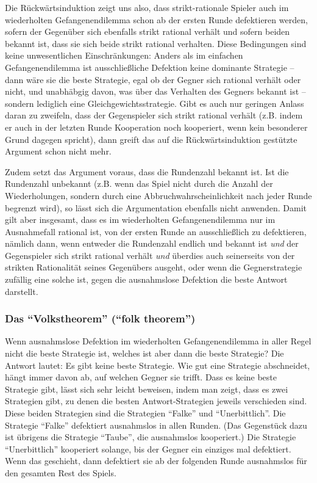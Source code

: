 Die Rückwärtsinduktion zeigt uns also, dass strikt-rationale Spieler
auch im wiederholten Gefangenendilemma schon ab der ersten Runde defektieren
werden, sofern der Gegenüber sich ebenfalls strikt rational verhält und sofern
beiden bekannt ist, dass sie sich beide strikt rational verhalten. Diese
Bedingungen sind keine unwesentlichen Einschränkungen: Anders als im einfachen
Gefangenendilemma ist ausschließliche Defektion keine dominante Strategie --
dann wäre sie die beste Strategie, egal ob der Gegner sich rational verhält
oder nicht, und unabhäbgig davon, was über das Verhalten des Gegners bekannt
ist -- sondern lediglich eine Gleichgewichtsstrategie. Gibt es auch nur
geringen Anlass daran zu zweifeln, dass der Gegenspieler sich strikt
rational verhält (z.B. indem er auch in der letzten Runde Kooperation noch
kooperiert, wenn kein besonderer Grund dagegen spricht), dann greift das
auf die Rückwärtsinduktion gestützte Argument schon nicht mehr.

Zudem setzt das Argument voraus, dass die Rundenzahl bekannt ist. Ist die
Rundenzahl unbekannt (z.B. wenn das Spiel nicht durch die Anzahl der
Wiederholungen, sondern durch eine Abbruchwahrscheinlichkeit nach jeder Runde
begrenzt wird), so lässt sich die Argumentation ebenfalls nicht anwenden. Damit
gilt aber insgesamt, dass es im wiederholten Gefangenendilemma nur im
Ausnahmefall rational ist, von der ersten Runde an ausschließlich zu
defektieren, nämlich dann, wenn entweder die Rundenzahl endlich und bekannt ist
{\em und} der Gegenspieler sich strikt rational verhält {\em und} überdies auch
seinerseits von der strikten Rationalität seines Gegenübers ausgeht, oder wenn die
Gegnerstrategie zufällig eine solche ist, gegen die ausnahmslose Defektion die
beste Antwort darstellt.

\subsubsection{Das "`Volkstheorem"' ("`folk theorem"')}

Wenn ausnahmslose Defektion im wiederholten Gefangenendilemma in aller Regel
nicht die beste Strategie ist, welches ist aber dann die beste Strategie? Die
Antwort lautet: Es gibt keine beste Strategie. Wie gut eine Strategie
abschneidet, hängt immer davon ab, auf welchen Gegner sie trifft. Dass es keine
beste Strategie gibt, lässt sich sehr leicht beweisen, indem man zeigt, dass
es zwei Strategien gibt, zu denen die besten Antwort-Strategien jeweils
verschieden sind. Diese beiden Strategien sind die Strategien "`Falke"' und
"`Unerbittlich"'. Die Strategie "`Falke"' defektiert ausnahmslos in allen
Runden. (Das Gegenstück dazu ist übrigens die Strategie "`Taube"', die
ausnahmslos kooperiert.) Die Strategie "`Unerbittlich"' kooperiert solange, bis der Gegner
ein einziges mal defektiert. Wenn das geschieht, dann defektiert sie ab der
folgenden Runde ausnahmslos für den gesamten Rest des Spiels. 

